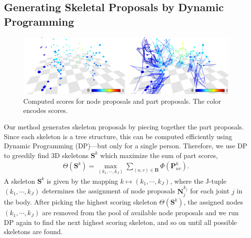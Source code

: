 \subsection{Generating Skeletal Proposals by Dynamic Programming}
\label{subsection:dynamicProgamming}


\begin{figure}
	\includegraphics[width=\linewidth]{figures/ProposalScores}
	\caption{Computed scores for node proposals and part proposals. The color encodes scores.} 
	\label{fig:proposalScores}
\end{figure}

Our method generates skeleton proposals by piecing together the part proposals. Since each skeleton is a tree structure, this can be computed efficiently using Dynamic Programming (DP)---but only for a single person. Therefore, we use DP to greedily find 3D skeletons $\mathbf{S}^k$ which maximize the sum of part scores,
\begin{gather}
\Theta (\mathbf{S}^k)= \max_{(k_{1},\cdots,k_J)}\sum_{(u,v) \in \mathbf{B}} {\Phi} \left( \mathbf{P}_{uv}^{k} \right). \nonumber
\end{gather}
A skeleton $\mathbf{S}^k$ is given by the mapping $k\mapsto(k_1,\cdots,k_J)$, where the J-tuple $(k_1,\cdots,k_J)$ determines the assignment of node proposals $\mathbf{N}_j^{k_j}$ for each joint $j$ in the body. After picking the highest scoring skeleton $\Theta(\mathbf{S}^k)$, the assigned nodes $(k_1,\cdots,k_J)$ are removed from the pool of available node proposals and we run DP again to find the next highest scoring skeleton, and so on until all possible skeletons are found.

